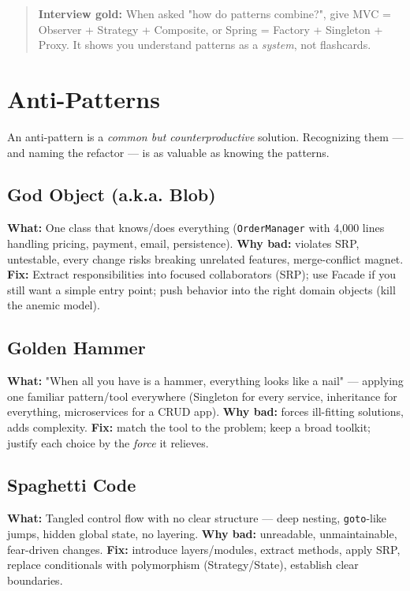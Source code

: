 \documentclass[11pt]{article}
\begin{document}
\begin{quote}
\textbf{Interview gold:} When asked "how do patterns combine?", give MVC = Observer + Strategy + Composite, or Spring = Factory + Singleton + Proxy. It shows you understand patterns as a \emph{system}, not flashcards.
\end{quote}

\section{Anti-Patterns}\label{anti-patterns}

An anti-pattern is a \emph{common but counterproductive} solution. Recognizing them --- and naming the refactor --- is as valuable as knowing the patterns.

\subsection{God Object (a.k.a. Blob)}\label{god-object-aka-blob}

\textbf{What:} One class that knows/does everything (\texttt{OrderManager} with 4,000 lines handling pricing, payment, email, persistence). \textbf{Why bad:} violates SRP, untestable, every change risks breaking unrelated features, merge-conflict magnet. \textbf{Fix:} Extract responsibilities into focused collaborators (SRP); use Facade if you still want a simple entry point; push behavior into the right domain objects (kill the anemic model).

\subsection{Golden Hammer}\label{golden-hammer}

\textbf{What:} "When all you have is a hammer, everything looks like a nail" --- applying one familiar pattern/tool everywhere (Singleton for every service, inheritance for everything, microservices for a CRUD app). \textbf{Why bad:} forces ill-fitting solutions, adds complexity. \textbf{Fix:} match the tool to the problem; keep a broad toolkit; justify each choice by the \emph{force} it relieves.

\subsection{Spaghetti Code}\label{spaghetti-code}

\textbf{What:} Tangled control flow with no clear structure --- deep nesting, \texttt{goto}-like jumps, hidden global state, no layering. \textbf{Why bad:} unreadable, unmaintainable, fear-driven changes. \textbf{Fix:} introduce layers/modules, extract methods, apply SRP, replace conditionals with polymorphism (Strategy/State), establish clear boundaries.
\end{document}
